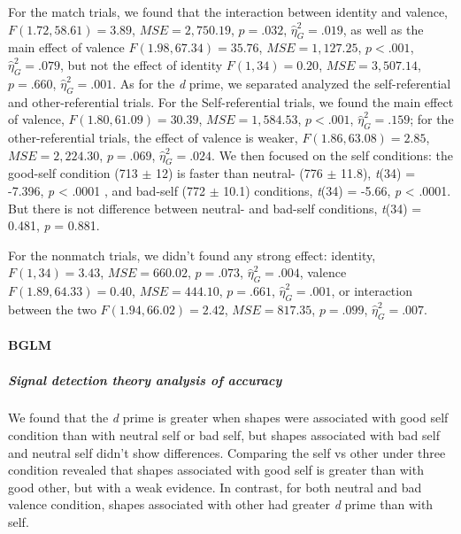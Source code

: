 \documentclass[
  english,
  man]{apa6}
\let\oldparagraph\paragraph
\renewcommand{\paragraph}[1]{\oldparagraph{#1}\mbox{}}
\let\oldsubparagraph\subparagraph
\renewcommand{\subparagraph}[1]{\oldsubparagraph{#1}\mbox{}}
\begin{document}
For the match trials, we found that the interaction between identity and valence, \(F(1.72, 58.61) = 3.89\), \(\mathit{MSE} = 2,750.19\), \(p = .032\), \(\hat{\eta}^2_G = .019\), as well as the main effect of valence \(F(1.98, 67.34) = 35.76\), \(\mathit{MSE} = 1,127.25\), \(p < .001\), \(\hat{\eta}^2_G = .079\), but not the effect of identity \(F(1, 34) = 0.20\), \(\mathit{MSE} = 3,507.14\), \(p = .660\), \(\hat{\eta}^2_G = .001\). As for the \emph{d} prime, we separated analyzed the self-referential and other-referential trials. For the Self-referential trials, we found the main effect of valence, \(F(1.80, 61.09) = 30.39\), \(\mathit{MSE} = 1,584.53\), \(p < .001\), \(\hat{\eta}^2_G = .159\); for the other-referential trials, the effect of valence is weaker, \(F(1.86, 63.08) = 2.85\), \(\mathit{MSE} = 2,224.30\), \(p = .069\), \(\hat{\eta}^2_G = .024\). We then focused on the self conditions: the good-self condition (713 \(\pm\) 12) is faster than neutral- (776 \(\pm\) 11.8), \emph{t}(34) = -7.396, \emph{p} \textless{} .0001 , and bad-self (772 \(\pm\) 10.1) conditions, \emph{t}(34) = -5.66, \emph{p} \textless{} .0001. But there is not difference between neutral- and bad-self conditions, \emph{t}(34) = 0.481, \emph{p} = 0.881.

For the nonmatch trials, we didn't found any strong effect: identity, \(F(1, 34) = 3.43\), \(\mathit{MSE} = 660.02\), \(p = .073\), \(\hat{\eta}^2_G = .004\), valence \(F(1.89, 64.33) = 0.40\), \(\mathit{MSE} = 444.10\), \(p = .661\), \(\hat{\eta}^2_G = .001\), or interaction between the two \(F(1.94, 66.02) = 2.42\), \(\mathit{MSE} = 817.35\), \(p = .099\), \(\hat{\eta}^2_G = .007\).

\hypertarget{bglm-2}{%
\paragraph{BGLM}\label{bglm-2}}

\hypertarget{signal-detection-theory-analysis-of-accuracy-4}{%
\subparagraph{Signal detection theory analysis of accuracy}\label{signal-detection-theory-analysis-of-accuracy-4}}

We found that the \emph{d} prime is greater when shapes were associated with good self condition than with neutral self or bad self, but shapes associated with bad self and neutral self didn't show differences. Comparing the self vs other under three condition revealed that shapes associated with good self is greater than with good other, but with a weak evidence. In contrast, for both neutral and bad valence condition, shapes associated with other had greater \emph{d} prime than with self.
\end{document}
